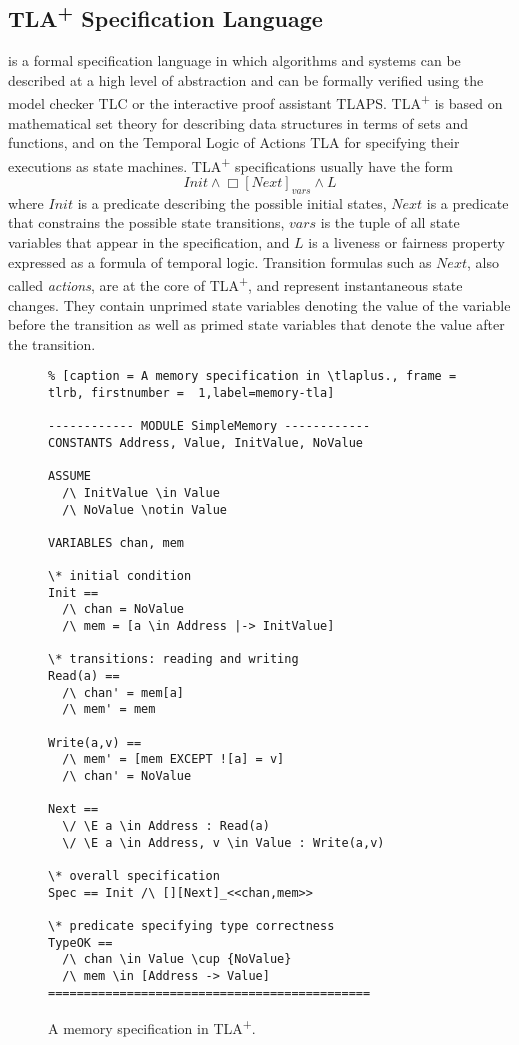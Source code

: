 \documentclass[journal]{IEEEtran}
\newcommand{\tlaplus}{TLA\textsuperscript{+}\xspace}
\begin{document}
\subsection{\tlaplus Specification Language}
is a formal specification language in which algorithms and systems can be described at a high level of abstraction and can be formally verified using the model checker TLC or the interactive proof assistant TLAPS. \tlaplus is based on mathematical set theory for describing data structures in terms of sets and functions, and on the Temporal Logic of Actions TLA for specifying their executions as state machines. \tlaplus specifications usually have the form
\[
  Init \land \Box[Next]_{vars} \land L
\]
where $Init$ is a predicate describing the possible initial states, $Next$ is a predicate that constrains the possible state transitions, $vars$ is the tuple of all state variables that appear in the specification, and $L$ is a liveness or fairness property expressed as a formula of temporal logic. Transition formulas such as $Next$, also called \emph{actions}, are at the core of \tlaplus, and represent instantaneous state changes. They contain unprimed state variables denoting the value of the variable before the transition as well as primed state variables that denote the value after the transition.

\begin{figure}
\begin{lstlisting}% [caption = A memory specification in \tlaplus., frame = tlrb, firstnumber =  1,label=memory-tla]

------------ MODULE SimpleMemory ------------
CONSTANTS Address, Value, InitValue, NoValue

ASSUME 
  /\ InitValue \in Value
  /\ NoValue \notin Value

VARIABLES chan, mem

\* initial condition
Init == 
  /\ chan = NoValue
  /\ mem = [a \in Address |-> InitValue]

\* transitions: reading and writing
Read(a) == 
  /\ chan' = mem[a]
  /\ mem' = mem

Write(a,v) ==
  /\ mem' = [mem EXCEPT ![a] = v]
  /\ chan' = NoValue

Next ==
  \/ \E a \in Address : Read(a)
  \/ \E a \in Address, v \in Value : Write(a,v)

\* overall specification
Spec == Init /\ [][Next]_<<chan,mem>>

\* predicate specifying type correctness
TypeOK == 
  /\ chan \in Value \cup {NoValue}
  /\ mem \in [Address -> Value] 
=============================================
\end{lstlisting}
\caption{A memory specification in \tlaplus.}
\label{memory-tla}
\end{figure}
\end{document}
